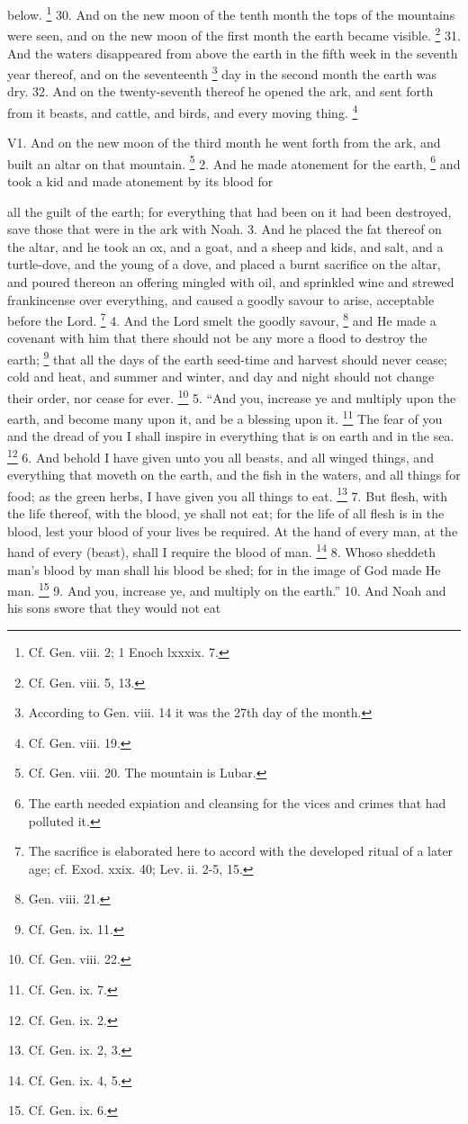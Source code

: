 below. \footnote{Cf. Gen. viii. 2; 1 Enoch lxxxix. 7.} 30. And on the new moon of the tenth month the tops of the mountains were seen, and on the new moon of the first month the earth became visible. \footnote{Cf. Gen. viii. 5, 13.} 31. And the waters disappeared from above the earth in the fifth week in the seventh year thereof, and on the seventeenth \footnote{According to Gen. viii. 14 it was the 27th day of the month.} day in the second month the earth was dry. 32. And on the twenty-seventh thereof he opened the ark, and sent forth from it beasts, and cattle, and birds, and every moving thing. \footnote{Cf. Gen. viii. 19.}


V1. And on the new moon of the third month he went forth from the ark, and built an altar on that mountain. \footnote{Cf. Gen. viii. 20. The mountain is Lubar.} 2. And he made atonement for the earth, \footnote{The earth needed expiation and cleansing for the vices and crimes that had polluted it.} and took a kid and made atonement by its blood for

all the guilt of the earth; for everything that had been on it had been destroyed, save those that were in the ark with Noah. 3. And he placed the fat thereof on the altar, and he took an ox, and a goat, and a sheep and kids, and salt, and a turtle-dove, and the young of a dove, and placed a burnt sacrifice on the altar, and poured thereon an offering mingled with oil, and sprinkled wine and strewed frankincense over everything, and caused a goodly savour to arise, acceptable before the Lord. \footnote{The sacrifice is elaborated here to accord with the developed ritual of a later age; cf. Exod. xxix. 40; Lev. ii. 2-5, 15.} 4. And the Lord smelt the goodly savour, \footnote{Gen. viii. 21.} and He made a covenant with him that there should not be any more a flood to destroy the earth; \footnote{Cf. Gen. ix. 11.} that all the days of the earth seed-time and harvest should never cease; cold and heat, and summer and winter, and day and night should not change their order, nor cease for ever. \footnote{Cf. Gen. viii. 22.} 5. ``And you, increase ye and multiply upon the earth, and become many upon it, and be a blessing upon it. \footnote{Cf. Gen. ix. 7.} The fear of you and the dread of you I shall inspire in everything that is on earth and in the sea. \footnote{Cf. Gen. ix. 2.} 6. And behold I have given unto you all beasts, and all winged things, and everything that moveth on the earth, and the fish in the waters, and all things for food; as the green herbs, I have given you all things to eat. \footnote{Cf. Gen. ix. 2, 3.} 7. But flesh, with the life thereof, with the blood, ye shall not eat; for the life of all flesh is in the blood, lest your blood of your lives be required. At the hand of every man, at the hand of every (beast), shall I require the blood of man. \footnote{Cf. Gen. ix. 4, 5.} 8. Whoso sheddeth man's blood by man shall his blood be shed; for in the image of God made He man. \footnote{Cf. Gen. ix. 6.} 9. And you, increase ye, and multiply on the earth.'' 10. And Noah and his sons swore that they would not eat

